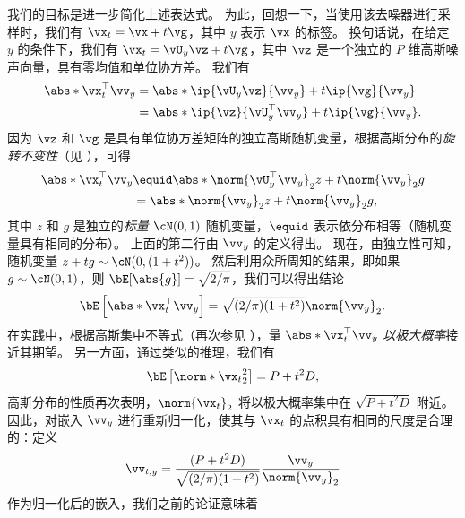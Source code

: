 \documentclass[../../book-main_zh.tex]{subfiles}
\begin{document}
\begin{example}
    我们的目标是进一步简化上述表达式。
    为此，回想一下，当使用该去噪器进行采样时，我们有
    $\vx_t = \vx + t \vg$，其中 $y$ 表示 $\vx$ 的标签。
    换句话说，在给定 $y$ 的条件下，我们有 $\vx_t = \vU_y \vz
    + t \vg$，其中 $\vz$ 是一个独立的 $P$ 维高斯噪声向量，具有零均值和单位协方差。
    我们有
    \begin{align*}
        \abs*{\vx_t^\top \vv_y}
        &=
        \abs*{\ip{\vU_y \vz}{\vv_y} + t \ip{\vg}{\vv_y}}
        \\
        &=
        \abs*{\ip{\vz}{\vU_y^\top \vv_y} + t \ip{\vg}{\vv_y}}.
    \end{align*}
    因为 $\vz$ 和 $\vg$ 是具有单位协方差矩阵的独立高斯随机变量，根据高斯分布的\textit{旋转不变性}（见 \cite{Vershynin2018-br}），可得
    \begin{align*}
        \abs*{\vx_t^\top \vv_y}
        &\equid
        \abs*{\norm{\vU_y^\top \vv_y}_2 z + t\norm{\vv_y}_2 g}
        \\
        &=
        \abs*{\norm{\vv_y}_2 z + t\norm{\vv_y}_2 g},
    \end{align*}
    其中 $z$ 和 $g$ 是独立的\textit{标量} $\cN(0, 1)$ 随机变量，$\equid$ 表示依分布相等（随机变量具有相同的分布）。
    上面的第二行由 $\vv_y$ 的定义得出。
    现在，由独立性可知，随机变量 $z + tg \sim \cN(0, (1 + t^2))$。
    然后利用众所周知的结果，即如果 $g
    \sim \cN(0, 1)$，则 $\bE[\abs{g}] = \sqrt{2/\pi}$，我们可以得出结论
    \begin{equation*}
        \bE\left[
            \abs*{\vx_t^\top \vv_y}
        \right]
        =
        \sqrt{(2/\pi) (1 + t^2)} \norm{\vv_y}_2.
    \end{equation*}
    在实践中，根据高斯集中不等式（再次参见 \cite{Vershynin2018-br}），量 $ \abs*{\vx_t^\top \vv_y}$ \textit{以极大概率}接近其期望。
    另一方面，通过类似的推理，我们有
    \begin{equation*}
        \bE\left[
            \norm*{\vx_t}_2^2
        \right]
        =
        P + t^2 D,
    \end{equation*}
    高斯分布的性质再次表明，$\norm{\vx_t}_2$ 将以极大概率集中在 $\sqrt{P + t^2 D}$ 附近。
    因此，对嵌入 $\vv_y$ 进行重新归一化，使其与 $\vx_t$ 的点积具有相同的尺度是合理的：定义
    \begin{equation*}
        \vv_{t, y} = \frac{(P + t^2 D)}{\sqrt{(2/\pi)(1 + t^2)}}
        \frac{\vv_y}{\norm{\vv_y}_2}
    \end{equation*}
    作为归一化后的嵌入，我们之前的论证意味着
    \begin{equation*}

\end{equation*}
\end{example}
\end{document}
